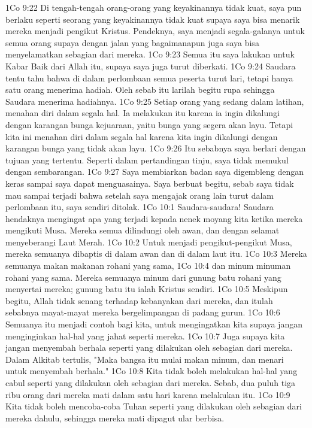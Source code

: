 1Co 9:22  Di tengah-tengah orang-orang yang keyakinannya tidak kuat, saya pun berlaku seperti seorang yang keyakinannya tidak kuat supaya saya bisa menarik mereka menjadi pengikut Kristus. Pendeknya, saya menjadi segala-galanya untuk semua orang supaya dengan jalan yang bagaimanapun juga saya bisa menyelamatkan sebagian dari mereka.
1Co 9:23  Semua itu saya lakukan untuk Kabar Baik dari Allah itu, supaya saya juga turut diberkati.
1Co 9:24  Saudara tentu tahu bahwa di dalam perlombaan semua peserta turut lari, tetapi hanya satu orang menerima hadiah. Oleh sebab itu larilah begitu rupa sehingga Saudara menerima hadiahnya.
1Co 9:25  Setiap orang yang sedang dalam latihan, menahan diri dalam segala hal. Ia melakukan itu karena ia ingin dikalungi dengan karangan bunga kejuaraan, yaitu bunga yang segera akan layu. Tetapi kita ini menahan diri dalam segala hal karena kita ingin dikalungi dengan karangan bunga yang tidak akan layu.
1Co 9:26  Itu sebabnya saya berlari dengan tujuan yang tertentu. Seperti dalam pertandingan tinju, saya tidak memukul dengan sembarangan.
1Co 9:27  Saya membiarkan badan saya digembleng dengan keras sampai saya dapat menguasainya. Saya berbuat begitu, sebab saya tidak mau sampai terjadi bahwa setelah saya mengajak orang lain turut dalam perlombaan itu, saya sendiri ditolak.
1Co 10:1  Saudara-saudara! Saudara hendaknya mengingat apa yang terjadi kepada nenek moyang kita ketika mereka mengikuti Musa. Mereka semua dilindungi oleh awan, dan dengan selamat menyeberangi Laut Merah.
1Co 10:2  Untuk menjadi pengikut-pengikut Musa, mereka semuanya dibaptis di dalam awan dan di dalam laut itu.
1Co 10:3  Mereka semuanya makan makanan rohani yang sama,
1Co 10:4  dan minum minuman rohani yang sama. Mereka semuanya minum dari gunung batu rohani yang menyertai mereka; gunung batu itu ialah Kristus sendiri.
1Co 10:5  Meskipun begitu, Allah tidak senang terhadap kebanyakan dari mereka, dan itulah sebabnya mayat-mayat mereka bergelimpangan di padang gurun.
1Co 10:6  Semuanya itu menjadi contoh bagi kita, untuk mengingatkan kita supaya jangan menginginkan hal-hal yang jahat seperti mereka.
1Co 10:7  Juga supaya kita jangan menyembah berhala seperti yang dilakukan oleh sebagian dari mereka. Dalam Alkitab tertulis, "Maka bangsa itu mulai makan minum, dan menari untuk menyembah berhala."
1Co 10:8  Kita tidak boleh melakukan hal-hal yang cabul seperti yang dilakukan oleh sebagian dari mereka. Sebab, dua puluh tiga ribu orang dari mereka mati dalam satu hari karena melakukan itu.
1Co 10:9  Kita tidak boleh mencoba-coba Tuhan seperti yang dilakukan oleh sebagian dari mereka dahulu, sehingga mereka mati dipagut ular berbisa.
